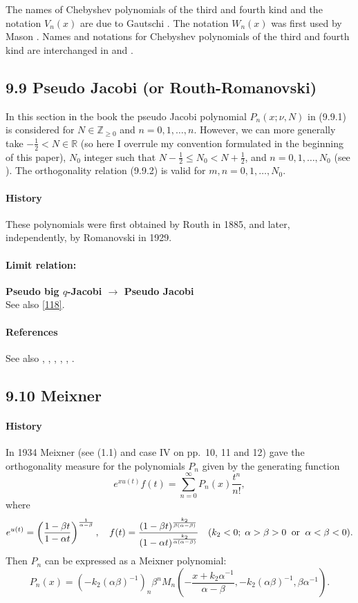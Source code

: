 \documentclass[twoside,11pt]{article}
\newcommand\RR{\mathbb{R}}
\newcommand\ZZ{\mathbb{Z}}
\newcommand\al\alpha
\newcommand\be\beta
\newcommand\thalf{\tfrac12}
\newcommand\iy\infty
\begin{document}
The names of Chebyshev polynomials of the third and fourth kind
and the notation $V_n(x)$ are due to Gautschi \cite{K21}.
The notation $W_n(x)$ was first used by Mason \cite{K22}.
Names and notations for Chebyshev polynomials of the third and fourth
kind are interchanged in  and
.
%
\subsection*{9.9 Pseudo Jacobi (or Routh-Romanovski)}
\label{sec9.9}
In this section in the book the pseudo Jacobi polynomial $P_n(x;\nu,N)$ in (9.9.1)
is considered
for $N\in\ZZ_{\ge0}$ and $n=0,1,\ldots,n$. However, we can more generally take
$-\thalf<N\in\RR$ (so here I overrule my convention formulated in the
beginning of this paper), $N_0$ integer such that $N-\thalf\le N_0<N+\thalf$, and $n=0,1,\ldots,N_0$
(see ). The orthogonality relation (9.9.2)
is valid for $m,n=0,1,\ldots,N_0$.
%
\paragraph{History}
These polynomials were first obtained by Routh \cite{K13} in 1885, and later, independently,
by Romanovski  in 1929.
%
\paragraph{Limit relation:}
{\bf Pseudo big $q$-Jacobi $\longrightarrow$ Pseudo Jacobi}\\
See also \eqref{118}.
%
\paragraph{References}
See also , ,
, \cite{K11}, \cite{K10}, \cite{K12}.
%
\subsection*{9.10 Meixner}
\label{sec9.10}
\paragraph{History}
In 1934 Meixner  (see
(1.1) and case IV on pp.~10, 11 and 12) gave the orthogonality
measure for the polynomials $P_n$ given by the generating function
\[
e^{x u(t)} f(t)=\sum_{n=0}^\iy P_n(x) \frac{t^n}{n!} ,
\]
where
\[
e^{u(t)}=\left(\frac{1-\be t}{1-\al t}\right)^{\frac1{\al-\be}},\quad
f(t)=\frac{(1-\be t)^{\frac{k_2}{\be(\al-\be)}}}{(1-\al t)^{\frac{k_2}{\al(\al-\be)}}}\quad
(k_2<0;\;\al>\be>0\;\;{\rm or}\;\;\al<\be<0).
\]
Then $P_n$ can be expressed as a Meixner polynomial:
\[
P_n(x)=(-k_2(\al\be)^{-1})_n \be^n 
M_n\left(- \frac{x+k_2\al^{-1}}{\al-\be},-k_2(\al\be)^{-1},\be\al^{-1}\right).
\]
\end{document}
